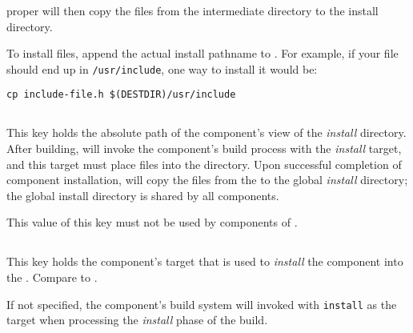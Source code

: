 \lmsbw proper will then copy the files from the intermediate directory
to the install directory.

To install files, append the actual install pathname to \destdir.  For
example, if your file should end up in \texttt{/usr/include}, one way
to install it would be:

\begin{verbatim}
cp include-file.h $(DESTDIR)/usr/include
\end{verbatim}


\subsection{}\label{variables:install-directory}

This key holds the absolute path of the component's view of the
\emph{install} directory.  After building, \lmsbw will invoke the
component's build process with the \emph{install} target, and this
target must place files into the \destdir directory.  Upon successful
completion of component installation, \lmsbw will copy the files from
the \destdir to the global \emph{install} directory; the global
install directory is shared by all components.

This value of this key must not be used by components of \lmsbw.


\subsection{}\label{variables:install-target}

This key holds the component's \makefile target that is used to
\emph{install} the component into the \destdir.  Compare to
.

If not specified, the component's build system will invoked with
\texttt{install} as the target when processing the \emph{install}
phase of the build.


\subsection{}\label{variables:kind}

